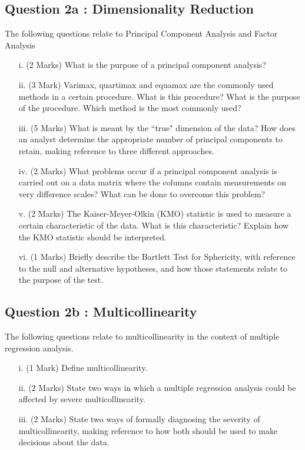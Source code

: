 \documentclass[a4paper,12pt]{article}
\begin{document}
\subsection*{Question 2a : Dimensionality Reduction}
The following questions relate to Principal Component Analysis and Factor Analysis
\begin{itemize}

\item[i.](2 Marks)	What is the purpose of a principal component analysis?
\item[ii.](3 Mark) Varimax, quartimax and equamax are the commonly used methods in a certain procedure.
What is this procedure? What is the purpose of the procedure. Which method is the
most commonly used?
\item[iii.](5 Marks)	What is meant by the ``true" dimension of the data?  How does an analyst determine the appropriate number of principal components to retain, making reference to three different approaches.
\item[iv.](2 Marks)	What problems occur if a principal component analysis is carried out on a data matrix where the columns contain measurements on very difference scales?  What can be done to overcome this problem?

\item[v.](2 Marks) The Kaiser-Meyer-Olkin (KMO) statistic is used to measure a certain characteristic of the data. What is this characteristic? Explain how the KMO statistic should be interpreted.
\item[vi.](1 Marks) Briefly describe the Bartlett Test for Sphericity, with reference to the null and alternative hypotheses, and how those statements relate to the purpose of the test.


\end{itemize}



\subsection*{Question 2b : Multicollinearity} %



The following questions relate to multicollinearity in the context of multiple
regression analysis.
\begin{itemize}
\item[i.](1 Mark) Define multicollinearity.
\item[ii.](2 Marks) State two ways in which a multiple regression analysis could be affected by severe
multicollinearity.
\item[iii.](2 Marks) State two ways of formally diagnosing the severity of multicollinearity, making reference to how both should be used to make decisions about the data.

\end{itemize}
\end{document}
